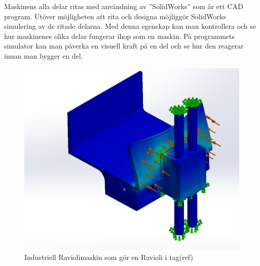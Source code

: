 Maskinens alla delar ritas med användning av ”SolidWorks” som är ett CAD program. Utöver möjligheten att rita och designa möjliggör SolidWorks simulering av de ritade delarna. Med denna egenskap kan man kontrollera och se hur maskinenes olika delar fungerar ihop som en maskin. På programmets simulator kan man påverka en visuell kraft på en del och se hur den reagerar innan man bygger en del.
\begin{figure}[ht]
	\begin{center}
		\includegraphics[scale=0.8]{images/hissEdited.png}
		\caption{Industriell Raviolimaskin som gör en Ravioli i tag(ref)}
		\label{simulering}	
	\end{center}
\end{figure}
